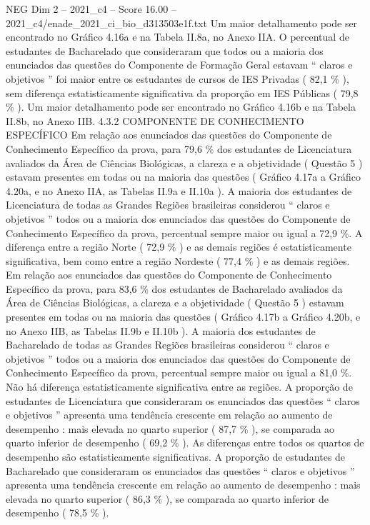 \begin{textsample}{NEG Dim 2 – 2021\_c4 – Score 16.00 – 2021\_c4/enade\_2021\_ci\_bio\_d313503e1f.txt}
Um maior detalhamento pode ser encontrado no Gráfico 4.16a e na Tabela II.8a, no Anexo IIA.
O percentual de estudantes de Bacharelado que consideraram que todos ou a maioria dos enunciados das questões do Componente de Formação Geral estavam “ claros e objetivos ” foi maior entre os estudantes de cursos de IES Privadas ( 82,1 \% ), sem diferença estatisticamente significativa da proporção em IES Públicas ( 79,8 \% ).
Um maior detalhamento pode ser encontrado no Gráfico 4.16b e na Tabela II.8b, no Anexo IIB. 4.3.2 COMPONENTE DE CONHECIMENTO ESPECÍFICO Em relação aos enunciados das questões do Componente de Conhecimento Específico da prova, para 79,6 \% dos estudantes de Licenciatura avaliados da Área de Ciências Biológicas, a clareza e a objetividade ( Questão 5 ) estavam presentes em todas ou na maioria das questões ( Gráfico 4.17a a Gráfico 4.20a, e no Anexo IIA, as Tabelas II.9a e II.10a ).
A maioria dos estudantes de Licenciatura de todas as Grandes Regiões brasileiras considerou “ claros e objetivos ” todos ou a maioria dos enunciados das questões do Componente de Conhecimento Específico da prova, percentual sempre maior ou igual a 72,9 \%.
A diferença entre a região Norte ( 72,9 \% ) e as demais regiões é estatisticamente significativa, bem como entre a região Nordeste ( 77,4 \% ) e as demais regiões.
Em relação aos enunciados das questões do Componente de Conhecimento Específico da prova, para 83,6 \% dos estudantes de Bacharelado avaliados da Área de Ciências Biológicas, a clareza e a objetividade ( Questão 5 ) estavam presentes em todas ou na maioria das questões ( Gráfico 4.17b a Gráfico 4.20b, e no Anexo IIB, as Tabelas II.9b e II.10b ).
A maioria dos estudantes de Bacharelado de todas as Grandes Regiões brasileiras considerou “ claros e objetivos ” todos ou a maioria dos enunciados das questões do Componente de Conhecimento Específico da prova, percentual sempre maior ou igual a 81,0 \%.
Não há diferença estatisticamente significativa entre as regiões.
A proporção de estudantes de Licenciatura que consideraram os enunciados das questões “ claros e objetivos ” apresenta uma tendência crescente em relação ao aumento de desempenho : mais elevada no quarto superior ( 87,7 \% ), se comparada ao quarto inferior de desempenho ( 69,2 \% ).
As diferenças entre todos os quartos de desempenho são estatisticamente significativas.
A proporção de estudantes de Bacharelado que consideraram os enunciados das questões “ claros e objetivos ” apresenta uma tendência crescente em relação ao aumento de desempenho : mais elevada no quarto superior ( 86,3 \% ), se comparada ao quarto inferior de desempenho ( 78,5 \% ).

\end{textsample}
